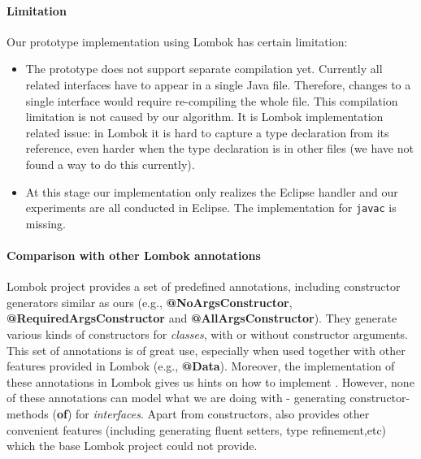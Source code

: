 \paragraph{Limitation}
Our prototype implementation using Lombok has certain limitation: 
\begin{itemize}
\item The prototype does not support separate compilation yet. Currently all
  related interfaces have to appear in a single Java file. Therefore, changes to
  a single interface would require re-compiling the whole file. This compilation
  limitation is not caused by our algorithm. It is Lombok implementation related
  issue: in Lombok it is hard to capture a type declaration from its reference,
  even harder when the type declaration is in other files (we have not found a
  way to do this currently).
\item At this stage our implementation only realizes the Eclipse handler and our
  experiments are all conducted in Eclipse. The implementation for
  \texttt{javac} is missing.
\end{itemize}

\paragraph{Comparison with other Lombok annotations}
Lombok project provides a set of predefined annotations, including constructor
generators similar as ours (e.g., \textbf{@NoArgsConstructor},
\textbf{@RequiredArgsConstructor} and \textbf{@AllArgsConstructor}). They
generate various kinds of constructors for \emph{classes}, with or without
constructor arguments. This set of annotations is of great use, especially when
used together with other features provided in Lombok (e.g.,
\textbf{@Data}). Moreover, the implementation of these annotations in Lombok
gives us hints on how to implement \mixin. However, none of these annotations
can model what we are doing with \mixin - generating constructor-methods
(\textbf{of}) for \emph{interfaces}. Apart from constructors, \mixin also
provides other convenient features (including generating fluent setters, type
refinement,etc) which the base Lombok project could not provide.
